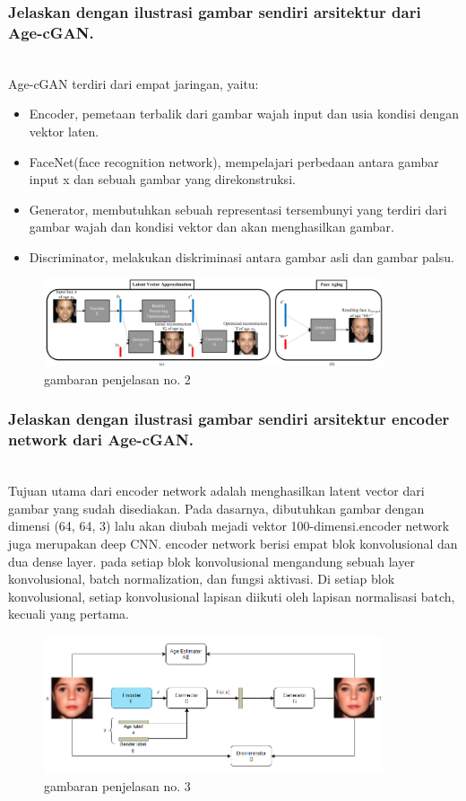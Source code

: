 \subsubsection{Jelaskan dengan ilustrasi gambar sendiri arsitektur dari Age-cGAN.}
\hfill\\
Age-cGAN terdiri dari empat jaringan, yaitu:
\begin{itemize}
\item Encoder, pemetaan terbalik dari gambar wajah input dan usia kondisi dengan vektor laten.
\item FaceNet(face recognition network), mempelajari perbedaan antara gambar input x dan sebuah gambar yang direkonstruksi. 
\item Generator, membutuhkan sebuah representasi tersembunyi yang terdiri dari gambar wajah dan kondisi vektor  dan  akan menghasilkan gambar.
\item Discriminator, melakukan diskriminasi antara gambar asli dan gambar palsu.
\end{itemize}

\begin{figure}[H]
	\centering
	\includegraphics[width=10cm]{figures/1174083/figures9/2.png}
	\caption{gambaran penjelasan no. 2}
\end{figure}

\subsubsection{Jelaskan dengan ilustrasi gambar sendiri arsitektur encoder network dari Age-cGAN.}
\hfill\\
Tujuan utama dari encoder network adalah menghasilkan latent vector dari gambar yang sudah disediakan. Pada dasarnya, dibutuhkan gambar dengan dimensi (64, 64, 3) lalu akan diubah mejadi vektor 100-dimensi.encoder network juga merupakan deep CNN. encoder network berisi empat blok konvolusional dan dua dense layer. pada setiap blok konvolusional mengandung sebuah layer konvolusional, batch normalization, dan fungsi aktivasi. Di setiap blok konvolusional, setiap konvolusional lapisan diikuti oleh lapisan normalisasi batch, kecuali yang pertama.
\begin{figure}[H]
	\centering
	\includegraphics[width=10cm]{figures/1174083/figures9/3.png}
	\caption{gambaran penjelasan no. 3}
\end{figure}


